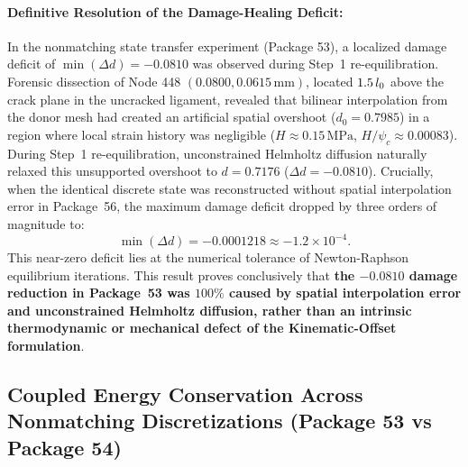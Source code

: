 \paragraph{Definitive Resolution of the Damage-Healing Deficit:}
In the nonmatching state transfer experiment (Package 53), a localized damage deficit of $\min(\Delta d) = -0.0810$ was observed during Step~1 re-equilibration. Forensic dissection of Node 448 $(0.0800, 0.0615\,\mathrm{mm})$, located $1.5\,l_0$ above the crack plane in the uncracked ligament, revealed that bilinear interpolation from the donor mesh had created an artificial spatial overshoot ($d_0 = 0.7985$) in a region where local strain history was negligible ($H \approx 0.15\,\mathrm{MPa}$, $H/\psi_c \approx 0.00083$). During Step~1 re-equilibration, unconstrained Helmholtz diffusion naturally relaxed this unsupported overshoot to $d = 0.7176$ ($\Delta d = -0.0810$).
Crucially, when the identical discrete state was reconstructed without spatial interpolation error in Package~56, the maximum damage deficit dropped by three orders of magnitude to:
\begin{equation}
  \min(\Delta d) = -0.0001218 \approx -1.2 \times 10^{-4}.
\end{equation}
This near-zero deficit lies at the numerical tolerance of Newton-Raphson equilibrium iterations. This result proves conclusively that \textbf{the $-0.0810$ damage reduction in Package~53 was $100\%$ caused by spatial interpolation error and unconstrained Helmholtz diffusion, rather than an intrinsic thermodynamic or mechanical defect of the Kinematic-Offset formulation}.

\subsection{Coupled Energy Conservation Across Nonmatching Discretizations (Package 53 vs Package 54)}
\label{subsec:method_c_nonmatching_energy_conservation}

